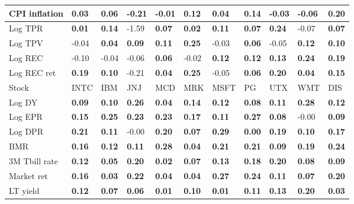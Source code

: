 \begin{table}[h!]
{\begin{center}
\begin{tabularx}{1\textwidth}{@{}X@{\hspace{0.25cm}}l@{\hspace{0.25cm}}l@{\hspace{0.25cm}}l@{\hspace{0.25cm}}l@{\hspace{0.25cm}}l@{\hspace{0.25cm}}l@{\hspace{0.25cm}}l@{\hspace{0.25cm}}l@{\hspace{0.25cm}}l@{\hspace{0.25cm}}l@{}}
 CPI inflation  & \textbf{0.03}	 & \textbf{0.06}	 & -0.21	 & -0.01	 & \textbf{0.12}	 & \textbf{0.04}	 & \textbf{0.14}	 & -0.03	 & -0.06	 & \textbf{0.20}	\\
\midrule
 Log TPR  & \textbf{0.01}	 & \textbf{0.14}	 & -1.59	 & \textbf{0.07}	 & \textbf{0.02}	 & \textbf{0.11}	 & \textbf{0.07}	 & \textbf{0.24}	 & -0.07	 & \textbf{0.07}	\\
 Log TPV  & -0.04	 & \textbf{0.04}	 & \textbf{0.09}	 & \textbf{0.11}	 & \textbf{0.25}	 & -0.03	 & \textbf{0.06}	 & -0.05	 & \textbf{0.12}	 & \textbf{0.10}	\\
 Log REC  & -0.10	 & -0.04	 & -0.06	 & \textbf{0.06}	 & -0.02	 & \textbf{0.12}	 & \textbf{0.12}	 & \textbf{0.13}	 & \textbf{0.24}	 & \textbf{0.19}	\\
 Log REC ret  & \textbf{0.19}	 & \textbf{0.10}	 & -0.21	 & \textbf{0.04}	 & \textbf{0.25}	 & -0.05	 & \textbf{0.06}	 & \textbf{0.20}	 & \textbf{0.04}	 & \textbf{0.15}	\\
\midrule
\midrule
 Stock  & INTC	 & IBM	 & JNJ	 & MCD	 & MRK	 & MSFT	 & PG	 & UTX	 & WMT	 & DIS	\\
\midrule
 Log DY  & \textbf{0.09}	 & \textbf{0.10}	 & \textbf{0.26}	 & \textbf{0.04}	 & \textbf{0.14}	 & \textbf{0.12}	 & \textbf{0.08}	 & \textbf{0.11}	 & \textbf{0.28}	 & \textbf{0.12}	\\
 Log EPR  & \textbf{0.15}	 & \textbf{0.25}	 & \textbf{0.23}	 & \textbf{0.23}	 & \textbf{0.17}	 & \textbf{0.11}	 & \textbf{0.27}	 & \textbf{0.08}	 & -0.00	 & \textbf{0.09}	\\
 Log DPR  & \textbf{0.21}	 & \textbf{0.11}	 & -0.00	 & \textbf{0.20}	 & \textbf{0.07}	 & \textbf{0.29}	 & \textbf{0.00}	 & \textbf{0.19}	 & \textbf{0.10}	 & \textbf{0.17}	\\
 BMR  & \textbf{0.16}	 & \textbf{0.12}	 & \textbf{0.11}	 & \textbf{0.28}	 & \textbf{0.04}	 & \textbf{0.21}	 & \textbf{0.21}	 & \textbf{0.09}	 & \textbf{0.19}	 & \textbf{0.24}	\\
\midrule
 3M Tbill rate  & \textbf{0.12}	 & \textbf{0.05}	 & \textbf{0.20}	 & \textbf{0.02}	 & \textbf{0.07}	 & \textbf{0.13}	 & \textbf{0.18}	 & \textbf{0.20}	 & \textbf{0.08}	 & \textbf{0.09}	\\
 Market ret  & \textbf{0.16}	 & \textbf{0.03}	 & \textbf{0.22}	 & \textbf{0.04}	 & \textbf{0.04}	 & \textbf{0.27}	 & \textbf{0.24}	 & \textbf{0.11}	 & \textbf{0.07}	 & \textbf{0.20}	\\
 LT yield  & \textbf{0.12}	 & \textbf{0.07}	 & \textbf{0.06}	 & \textbf{0.01}	 & \textbf{0.10}	 & \textbf{0.01}	 & \textbf{0.11}	 & \textbf{0.13}	 & \textbf{0.20}	 & \textbf{0.03}	\\

\end{tabularx}
\end{center}}
\end{table}
